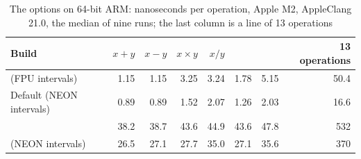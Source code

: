 \begin{table}[htbp]
  \centering\renewcommand{\arraystretch}{1.1}\footnotesize
  \caption[The options on 64-bit ARM (Apple M2, AppleClang 21.0)]{The options on 64-bit ARM: nanoseconds per operation, Apple M2, AppleClang 21.0, the median of nine runs; the last column is a line of 13 operations} \label{tab:install-worth-arm}
  \begin{tabular}{L{4.6cm}rrrrrrr}
    \hline
    Build & $x + y$ & $x - y$ & $x \times y$ & $x / y$ &  &
     & 13 operations\\
    \hline\hline
     (FPU intervals) & 1.15 & 1.15 & 3.25 & 3.24 & 1.78 & 5.15 & 50.4\\
    Default (NEON intervals) & 0.89 & 0.89 & 1.52 & 2.07 & 1.26 & 2.03 & 16.6\\
      & 38.2 & 38.7 & 43.6 & 44.9 & 43.6 & 47.8 & 532\\
     (NEON intervals) & 26.5 & 27.1 & 27.7 & 35.0 & 27.1 & 35.6 & 370\\
    \hline
  \end{tabular}

\end{table}

